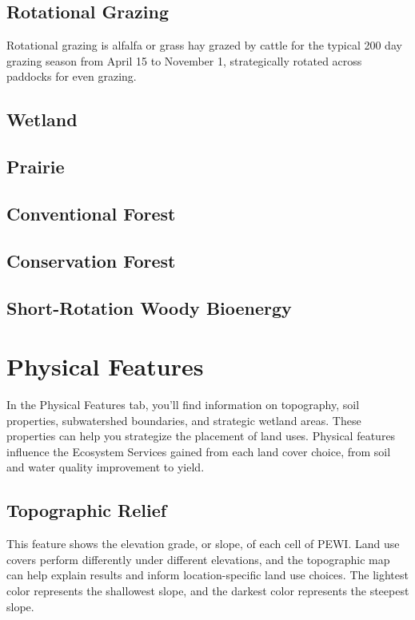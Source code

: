 \documentclass[11pt]{article}
\begin{document}
\subsection{Rotational Grazing}
Rotational grazing is alfalfa or grass hay grazed by cattle for the typical 200 day grazing season from April 15 to November 1, strategically rotated across paddocks for even grazing.\cite{11}

\subsection{Wetland}

\subsection{Prairie}

\subsection{Conventional Forest}

\subsection{Conservation Forest}

\subsection{Short-Rotation Woody Bioenergy}

\newpage
\section{Physical Features}\label{sec:physicalfeatures}
In the Physical Features tab, you'll find information on topography, soil properties, subwatershed boundaries, and strategic wetland areas. These properties can help you strategize the placement of land uses. Physical features influence the Ecosystem Services gained from each land cover choice, from soil and water quality improvement to yield.

\subsection{Topographic Relief}
This feature shows the elevation grade, or slope, of each cell of PEWI. Land use covers perform differently under different elevations, and the topographic map can help explain results and inform location-specific land use choices. The lightest color represents the shallowest slope, and the darkest color represents the steepest slope.
\end{document}
